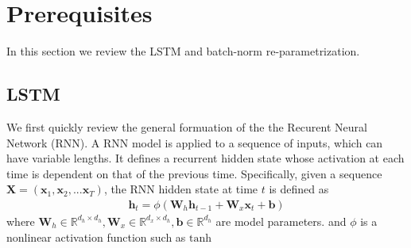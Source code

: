 \documentclass{article} %
\newcommand{\vect}[1]{\mathbf{#1}}
\newcommand{\mat}[1]{\mathbf{#1}}
\newcommand{\reals}{\mathbb{R}}
\begin{document}
\section{Prerequisites}
\label{sec:prerequisites}

In this section we review the LSTM and batch-norm re-parametrization.

\subsection{LSTM}

We first quickly review the general formuation of the the Recurent Neural Network (RNN).
A RNN model is applied to a sequence of inputs, which can have variable lengths.
It defines a recurrent hidden state whose activation at each time is dependent on that of the previous time. Specifically, given a sequence
$\mat{X} = ( \vect{x}_1, \vect{x}_2, ... \vect{x}_T )$, the RNN  hidden state at time $t$ is defined as
\begin{eqnarray}
  \mat{h}_t = \phi(\mat{W}_h \vect{h}_{t-1} + \mat{W}_x  \vect{x}_t + \vect{b})
\end{eqnarray}
where $\mat{W}_h \in \reals^{d_h \times d_h}, \mat{W}_x \in \reals^{d_x \times d_h}, \vect{b} \in \reals^{d_h}$ are model parameters.
and $\phi$  is a nonlinear activation function such as $\mathrm{tanh}$
\end{document}
